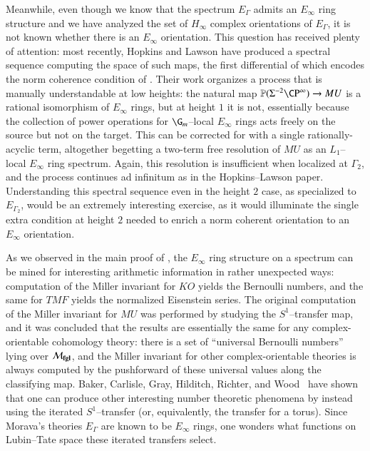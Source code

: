 Meanwhile, even though we know that the spectrum $E_\Gamma$ admits an $E_\infty$ ring structure and we have analyzed the set of $H_\infty$ complex orientations of $E_\Gamma$, it is not known whether there is an $E_\infty$ orientation.  This question has received plenty of attention: most recently, Hopkins and Lawson have produced a spectral sequence computing the space of such maps, the first differential of which encodes the norm coherence condition of .  Their work organizes a process that is manually understandable at low heights: the natural map $\mathbb P(\Susp^{-2} \CP^\infty) \to MU$ is a rational isomorphism of $E_\infty$ rings, but at height $1$ it is not, essentially because the collection of power operations for $\G_m$--local $E_\infty$ rings acts freely on the source but not on the target.  This can be corrected for with a single rationally-acyclic term, altogether begetting a two-term free resolution of $MU$ as an $L_1$--local $E_\infty$ ring spectrum.  Again, this resolution is insufficient when localized at $\Gamma_2$, and the process continues ad infinitum as in the Hopkins--Lawson paper.  Understanding this spectral sequence even in the height $2$ case, as specialized to $E_{\Gamma_2}$, would be an extremely interesting exercise, as it would illuminate the single extra condition at height $2$ needed to enrich a norm coherent orientation to an $E_\infty$ orientation.







As we observed in the main proof of , the $E_\infty$ ring structure on a spectrum can be mined for interesting arithmetic information in rather unexpected ways: computation of the Miller invariant for $KO$ yields the Bernoulli numbers, and the same for $TMF$ yields the normalized Eisenstein series.  The original computation of the Miller invariant for $MU$ was performed by studying the $S^1$--transfer map, and it was concluded that the results are essentially the same for any complex-orientable cohomology theory: there is a set of ``universal Bernoulli numbers'' lying over $\mathcal{M}_{\mathbf{fgl}}$, and the Miller invariant for other complex-orientable theories is always computed by the pushforward of these universal values along the classifying map.  Baker, Carlisle, Gray, Hilditch, Richter, and Wood~\cite{BCGHRW} have shown that one can produce other interesting number theoretic phenomena by instead using the iterated $S^1$--transfer (or, equivalently, the transfer for a torus).  Since Morava's theories $E_\Gamma$ are known to be $E_\infty$ rings, one wonders what functions on Lubin--Tate space these iterated transfers select.

